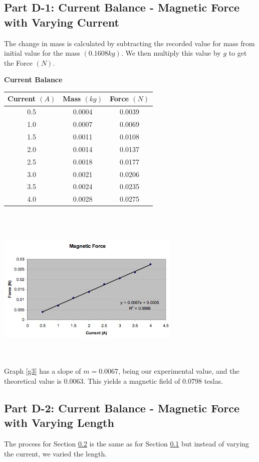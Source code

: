 \documentclass[titlepage]{article}
\begin{document}
\subsection{Part D-1: Current Balance - Magnetic Force with Varying Current}\label{sub:part_d_1_current_balance_magnetic_force_with_varying_current-anl}
The change in mass is calculated by subtracting the recorded value for mass from initial value for the mass $(0.1608 kg)$. We then multiply this value by $g$ to get the Force $(N)$.

\begin{center}\label{tbl11}
	\textbf{Current Balance}
	\begin{tabular}{ccc}
	\hline
	Current $(A)$ & Mass $(kg)$ & Force $(N)$\\
	\hline
	0.5 & 0.0004 & 0.0039\\
	\hline
	1.0 & 0.0007 & 0.0069\\
	\hline
	1.5 & 0.0011 & 0.0108\\
	\hline
	2.0 & 0.0014 & 0.0137\\
	\hline
	2.5 & 0.0018 & 0.0177\\
	\hline
	3.0 & 0.0021 & 0.0206\\
	\hline
	3.5 & 0.0024 & 0.0235\\
	\hline
	4.0 & 0.0028 & 0.0275\\
	\hline
	\end{tabular}
\end{center}\\
\\
\begin{center}\label{g3}
	\includegraphics{3.jpg}
\end{center}\\
\\
Graph \ref{g3} has a slope of $m = 0.0067$, being our experimental value, and the theoretical value is $0.0063$. This yields a magnetic field of $0.0798$ teslas.

\subsection{Part D-2: Current Balance - Magnetic Force with Varying Length}\label{sub:part_d_2_current_balance_magnetic_force_with_varying_length-anl}
The process for Section \ref{sub:part_d_2_current_balance_magnetic_force_with_varying_length-anl} is the same as for Section \ref{sub:part_d_1_current_balance_magnetic_force_with_varying_current-anl} but instead of varying the current, we varied the length.
\end{document}
